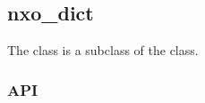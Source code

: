 %
%
%
%
%              

\subsection{nxo\_dict}
\label{nxo_dict}

The  class is a subclass of the  class.

\subsubsection{API}

